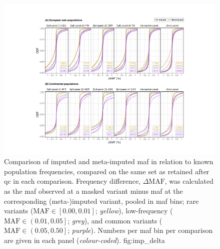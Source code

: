 

\begin{figure}[!htb]
\includegraphics[width=\textwidth]{./img/ch2/accuracy_imputed_delta}
{Comparison of imputed and meta-imputed \gls{maf} in relation to known population frequencies, compared on the same set as retained after \gls{qc} in each comparison.
Frequency difference, ${\Delta\text{MAF}}$, was calculated as the \gls{maf} observed at a masked variant minus \gls{maf} at the corresponding (meta-)imputed variant, pooled in  \gls{maf} bins; rare variants (${\text{MAF} \in \left[ 0.00, 0.01\right]}$; \emph{yellow}), low-frequency (${\text{MAF} \in \left( 0.01, 0.05\right]}$; \emph{grey}), and common variants (${\text{MAF} \in \left( 0.05, 0.50\right]}$; \emph{purple}).
Numbers per \gls{maf} bin per comparison are given in each panel (\emph{colour-coded}).}
{fig:imp_delta}
\end{figure}
